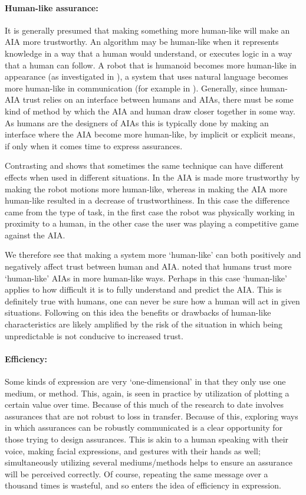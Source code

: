     \paragraph{Human-like assurance:} It is generally presumed that making something more human-like will make an AIA more trustworthy. An algorithm may be human-like when it represents knowledge in a way that a human would understand, or executes logic in a way that a human can follow. A robot that is humanoid becomes more human-like in appearance (as investigated in \cite{Bainbridge2011-pl}), a system that uses natural language becomes more human-like in communication (for example in \cite{Lacave2002-cu}). Generally, since human-AIA trust relies on an interface between humans and AIAs, there must be some kind of method by which the AIA and human draw closer together in some way. As humans are the designers of AIAs this is typically done by making an interface where the AIA become more human-like, by implicit or explicit means, if only when it comes time to express assurances.

    Contrasting \cite{Dragan2013-wd} and \cite{Wu2016-ei} shows that sometimes the same technique can have different effects when used in different situations. In \cite{Dragan2013-wd} the AIA is made more trustworthy by making the robot motions more human-like, whereas in \cite{Wu2016-ei} making the AIA more human-like resulted in a decrease of trustworthiness. In this case the difference came from the type of task, in the first case the robot was physically working in proximity to a human, in the other case the user was playing a competitive game against the AIA.

    We therefore see that making a system more `human-like' can both positively and negatively affect trust between human and AIA. 
    \citet{Tripp2011-rx} noted that humans trust more `human-like' AIAs in more human-like ways. Perhaps in this case `human-like' applies to how difficult it is to fully understand and predict the AIA. This is definitely true with humans, one can never be sure how a human will act in given situations. Following on this idea the benefits or drawbacks of human-like characteristics are likely amplified by the risk of the situation in which being unpredictable is not conducive to increased trust.

    \paragraph{Efficiency:} Some kinds of expression are very `one-dimensional' in that they only use one medium, or method. This, again, is seen in practice by utilization of plotting a certain value over time. Because of this much of the research to date involves assurances that are not robust to loss in transfer. Because of this, exploring ways in which assurances can be robustly communicated is a clear opportunity for those trying to design assurances. This is akin to a human speaking with their voice, making facial expressions, and gestures with their hands as well; simultaneously utilizing several mediums/methods helps to ensure an assurance will be perceived correctly. Of course, repeating the same message over a thousand times is wasteful, and so enters the idea of efficiency in expression.

